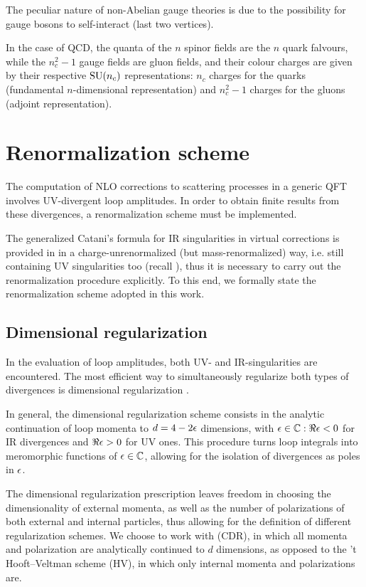 The peculiar nature of non-Abelian gauge theories is due to the possibility for gauge bosons to self-interact (last two vertices).

In the case of QCD, the quanta of the $ n $ spinor fields are the $ n $ quark falvours, while the $ n_c^2 - 1 $ gauge fields are gluon fields, and their colour charges are given by their respective $ \mathrm{SU}(n_c) $ representations: $ n_c $ charges for the quarks (fundamental $ n $-dimensional representation) and $ n_c^2 - 1 $ charges for the gluons (adjoint representation).

\section{Renormalization scheme}
\label{sec:renorm}

The computation of NLO corrections to scattering processes in a generic QFT involves UV-divergent loop amplitudes. In order to obtain finite results from these divergences, a renormalization scheme must be implemented.

The generalized Catani's formula for IR singularities in virtual corrections is provided in \cite{Catani-2001} in a charge-unrenormalized (but mass-renormalized) way, i.e. still containing UV singularities too (recall ), thus it is necessary to carry out the renormalization procedure explicitly. To this end, we formally state the renormalization scheme adopted in this work.

\subsection{Dimensional regularization}
\label{ssec:dim-reg}

In the evaluation of loop amplitudes, both UV- and IR-singularities are encountered. The most efficient way to simultaneously regularize both types of divergences is dimensional regularization \cite{dim-reg}.

In general, the dimensional regularization scheme consists in the analytic continuation of loop momenta to $ d = 4 - 2 \epsilon $ dimensions, with $ \epsilon \in \mathbb{C} : \Re\epsilon < 0 $ for IR divergences and $ \Re\epsilon > 0 $ for UV ones. This procedure turns loop integrals into meromorphic functions of $ \epsilon \in \mathbb{C} $, allowing for the isolation of divergences as poles in $ \epsilon $.

The dimensional regularization prescription leaves freedom in choosing the dimensionality of external momenta, as well as the number of polarizations of both external and internal particles, thus allowing for the definition of different regularization schemes. We choose to work with  (CDR), in which all momenta and polarization are analytically continued to $ d $ dimensions, as opposed to the 't Hooft--Veltman scheme (HV), in which only internal momenta and polarizations are.

